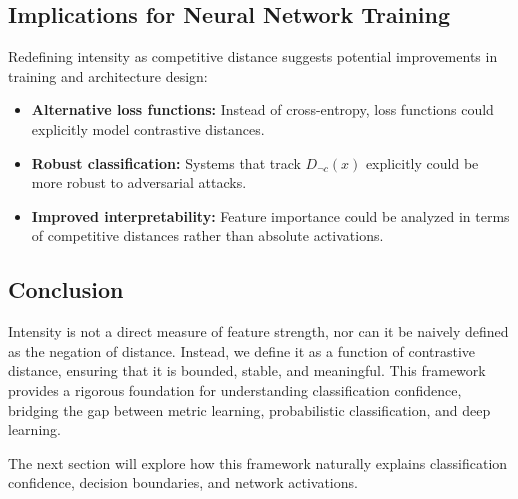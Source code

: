 \subsection{Implications for Neural Network Training}

Redefining intensity as competitive distance suggests potential improvements in training and architecture design:

\begin{itemize}
    \item \textbf{Alternative loss functions:} Instead of cross-entropy, loss functions could explicitly model contrastive distances.
    \item \textbf{Robust classification:} Systems that track \( D_{\neg c}(x) \) explicitly could be more robust to adversarial attacks.
    \item \textbf{Improved interpretability:} Feature importance could be analyzed in terms of competitive distances rather than absolute activations.
\end{itemize}

\subsection{Conclusion}

Intensity is not a direct measure of feature strength, nor can it be naively defined as the negation of distance. Instead, we define it as a function of contrastive distance, ensuring that it is bounded, stable, and meaningful. This framework provides a rigorous foundation for understanding classification confidence, bridging the gap between metric learning, probabilistic classification, and deep learning.

The next section will explore how this framework naturally explains classification confidence, decision boundaries, and network activations.

